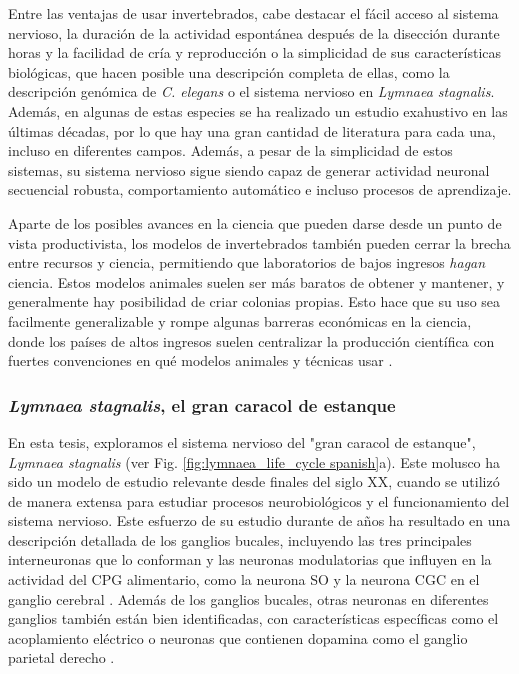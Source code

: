 Entre las ventajas de usar invertebrados, cabe destacar el fácil acceso al sistema nervioso, la duración de la actividad espontánea después de la disección durante horas y la facilidad de cría y reproducción o la simplicidad de sus características biológicas, que hacen posible una descripción completa de ellas, como la descripción genómica de \textit{C. elegans} o el sistema nervioso en \textit{Lymnaea stagnalis}. Además, en algunas de estas especies se ha realizado un estudio exahustivo en las últimas décadas, por lo que hay una gran cantidad de literatura para cada una, incluso en diferentes campos. Además, a pesar de la simplicidad de estos sistemas, su sistema nervioso sigue siendo capaz de generar actividad neuronal secuencial robusta, comportamiento automático e incluso procesos de aprendizaje.

Aparte de los posibles avances en la ciencia que pueden darse desde un punto de vista productivista, los modelos de invertebrados también pueden cerrar la brecha entre recursos y ciencia, permitiendo que laboratorios de bajos ingresos \textit{hagan} ciencia. Estos modelos animales suelen ser más baratos de obtener y mantener, y generalmente hay posibilidad de criar colonias propias. Esto hace que su uso sea facilmente generalizable y rompe algunas barreras económicas en la ciencia, donde los países de altos ingresos suelen centralizar la producción científica con fuertes convenciones en qué modelos animales y técnicas usar \parencite{castillo_spineless_2017,stephan_how_2015}.

\subsubsection{\textit{Lymnaea stagnalis}, el gran caracol de estanque}
En esta tesis, exploramos el sistema nervioso del "gran caracol de estanque", \textit{Lymnaea stagnalis} (ver Fig. \ref{fig:lymnaea_life_cycle spanish}a). Este molusco ha sido un modelo de estudio relevante desde finales del siglo XX, cuando se utilizó de manera extensa para estudiar procesos neurobiológicos y el funcionamiento del sistema nervioso. Este esfuerzo de su estudio durante de años ha resultado en una descripción detallada de los ganglios bucales, incluyendo las tres principales interneuronas que lo conforman \parencite{benjamin_snail_1989,benjamin_morphology_1979,rose_relationship_1979,brierley_behavioral_1997} y las neuronas modulatorias que influyen en la actividad del CPG alimentario, como la neurona SO y la neurona CGC en el ganglio cerebral \parencite{rose_interneuronal_1981,mccrohan_patterns_1980,kemenes_multiple_2001}. Además de los ganglios bucales, otras neuronas en diferentes ganglios también están bien identificadas, con características específicas como el acoplamiento eléctrico o neuronas que contienen dopamina como el ganglio parietal derecho \parencite{benjamin_electrotonic_1986,winlow_multiple_1981}.


